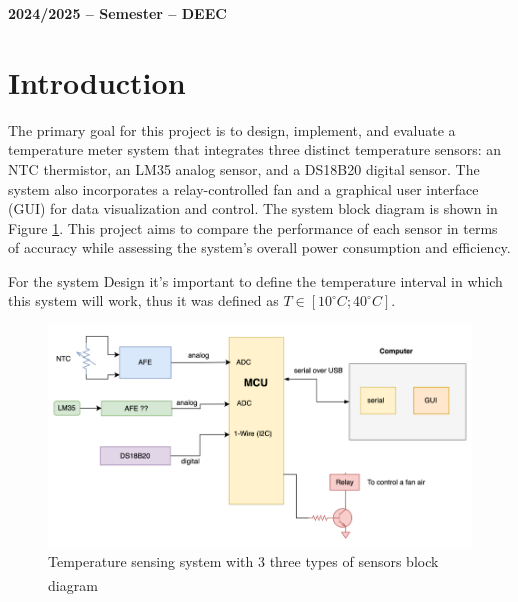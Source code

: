 \documentclass[12pt]{article}
\begin{document}

\vspace{6cm}

\begin{center}
    \large \bf 2024/2025 --  Semester -- DEEC
\end{center}

\thispagestyle{empty}

\setcounter{page}{0}

\newpage

\newpage

\tableofcontents %


\newpage

\listoffigures

\listoftables

\newpage

\section{Introduction}


    The primary goal for this project is to design, implement, and evaluate a temperature meter system that integrates three distinct temperature sensors: an NTC thermistor, an LM35 analog sensor, and a DS18B20 digital sensor. The system also incorporates a relay-controlled fan and a graphical  user interface (GUI) for data visualization and control. The system block diagram is shown in Figure \ref{fig:design-system}. This project aims to compare the performance of each sensor in terms of accuracy while assessing the system's overall power consumption and efficiency.


    \label{requirements}
    For the system Design it's important to define the temperature interval in which this system will work, thus it was defined as $ T \in [10^\circ C; 40^\circ C]$. 

   \begin{figure}[H] 
        \centering
        \includegraphics*[scale = 0.5]{images/system-design.png}
        \caption{Temperature sensing system with 3 three types of sensors block diagram\textsuperscript{\cite{lab_statement}}}
        \label{fig:design-system}
    \end{figure}
\end{document}
